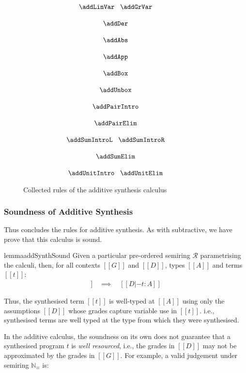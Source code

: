 \begin{figure}[t]
{\footnotesize{
\begin{gather*}
\hspace{-3em}\begin{array}{c}
  \addLinVar
  \;\;\;
  \addGrVar
\\[1.25em]
  \addDer
\\[1.25em]
  \addAbs
\\[1.25em]
  \addApp
\\[1.25em]
  \addBox
\\[1.25em]
  \addUnbox
\\[1.25em]
  \addPairIntro
\\[1.25em]
  \addPairElim
\\[1.25em]
  \addSumIntroL
\;\;\;
  \addSumIntroR
\\[1.25em]
  \addSumElim
\\[1.25em]
  \addUnitIntro
\;\;\;
  \addUnitElim
      \end{array}
  \end{gather*}
}}
\caption{Collected rules of the additive synthesis calculus}
\label{fig:add-rules}
  \end{figure}


  \subsubsection{Soundness of Additive Synthesis}
  \label{subsec:add-sound}
  Thus concludes the rules for additive synthesis. As with subtractive, we
  have prove that this calculus is sound.
  \begin{restatable}{lemma}{addSynthSound}
\label{lemma:addSynthSound} 
Given a particular pre-ordered semiring $\mathcal{R}$ parametrising the calculi,
then, for all contexts $[[ G ]]$ and $[[ D ]]$, types $[[ A ]]$ and terms $[[ t ]]$:
%
\begin{align*}
[[ G |- A =>+ t ; D ]] \quad \implies \quad [[ D |- t : A ]]
\end{align*}
\end{restatable}
Thus, the synthesised term $[[ t ]]$ is well-typed
at $[[ A ]]$ using only the assumptions $[[ D ]]$ whose grades capture variable use 
in $[[ t ]]$.
i.e., synthesised terms are well typed at the type from which they
were synthesised.

In the additive calculus, the soundness on its own does not
guarantee that a synthesised program $t$ is \emph{well resourced}, i.e., the
grades in $[[ D ]]$ may not be approximated by the grades in $[[ G ]]$. For
example, a valid judgement under
semiring $\mathbb{N}_\equiv$ is:

